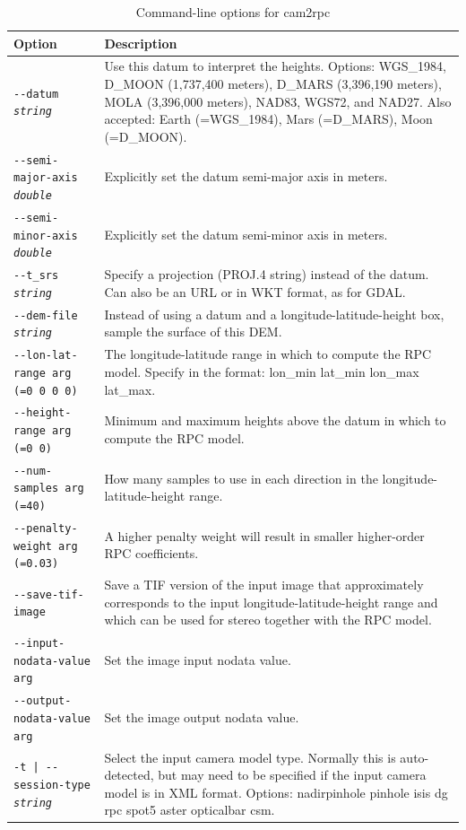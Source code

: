 \begin{longtable}{|l|p{7.0cm}|}
\caption{Command-line options for cam2rpc}
\label{tbl:cam2rpc}
\endfirsthead
\endhead
\endfoot
\endlastfoot
\hline
Option & Description \\ \hline \hline
\texttt{-\/-datum \textit{string}} & Use this datum to interpret the heights. Options: WGS\_1984, D\_MOON (1,737,400 meters), D\_MARS (3,396,190 meters), MOLA (3,396,000 meters), NAD83, WGS72, and NAD27. Also accepted: Earth (=WGS\_1984), Mars (=D\_MARS), Moon (=D\_MOON).\\ \hline
\texttt{-\/-semi-major-axis \textit{double}} & Explicitly set the datum semi-major axis
in meters.\\ \hline
\texttt{-\/-semi-minor-axis \textit{double}} & Explicitly set the datum semi-minor axis
in meters.\\ \hline
\texttt{-\/-t\_srs \textit{string}} & Specify a projection (PROJ.4 string) instead of the datum. Can also be an URL or in WKT format, as for GDAL.\\ \hline
\texttt{-\/-dem-file \textit{string}} & Instead of using a datum and a longitude-latitude-height box, sample the surface of this DEM.\\ \hline
\texttt{-\/-lon-lat-range arg (=0 0 0 0)} & The longitude-latitude range in which to compute the RPC model. Specify in the format: lon\_min lat\_min lon\_max lat\_max.\\ \hline
\texttt{-\/-height-range arg (=0 0)} & Minimum and maximum heights above the datum in which to compute the RPC model.\\ \hline
\texttt{-\/-num-samples arg (=40)} & How many samples to use in each direction in the longitude-latitude-height range.\\ \hline
\texttt{-\/-penalty-weight arg (=0.03)} & A higher penalty weight will result in smaller higher-order RPC coefficients.\\ \hline
\texttt{-\/-save-tif-image} & Save a TIF version of the input image that approximately corresponds to the input longitude-latitude-height range and which can be used for stereo together with the RPC model.\\ \hline
\texttt{-\/-input-nodata-value arg} & Set the image input nodata value.\\ \hline
\texttt{-\/-output-nodata-value arg} & Set the image output nodata value.\\ \hline
\texttt{-t | -\/-session-type  \textit{string}} & Select the input camera model type. Normally this is auto-detected, but may need to be specified if the input camera model is in XML format. Options: nadirpinhole pinhole isis dg rpc spot5 aster opticalbar csm.\\ \hline

\end{longtable}
